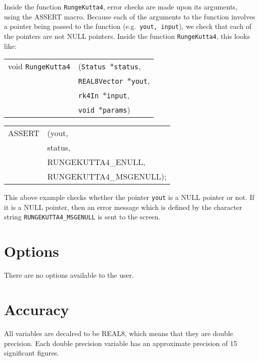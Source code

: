 \documentclass[12pt]{article}
\begin{document}
Inside the function \texttt{RungeKutta4}, error checks are made upon its arguments, using the ASSERT macro. Because each of the arguments to the function involves a pointer being passed to the function (e.g.\ \texttt{yout, input}), we check that each of the pointers are not NULL pointers.
Inside the function \texttt{RungeKutta4}, this looks like:

\vspace{5mm}

\begin{tabular}{ll}
void \texttt{RungeKutta4}&(\texttt{Status $\ast$status},     \\
                                   &\texttt{REAL8Vector $\ast$yout}, \\
                                   &\texttt{rk4In $\ast$input}, \\
                                   &\texttt{void $\ast$params})
\end{tabular}

\vspace{5mm}

\begin{tabular}{ll}
ASSERT & (yout,  \\
       &  status,    \\
       &  RUNGEKUTTA4\_ENULL, \\
       &  RUNGEKUTTA4\_MSGENULL);
\end{tabular}

\vspace{5mm}

This above example checks whether the pointer \texttt{yout} is a NULL pointer or not. If it is a NULL pointer, then an error message which is defined by the character string \texttt{RUNGEKUTTA4\_MSGENULL} is sent to the screen.


\section{Options}

There are no options available to the user.

\section{Accuracy}

All variables are decalred to be REAL8, which means that they are double precision.
Each double precision variable has an approximate precision of 15 significant figures.
\end{document}
